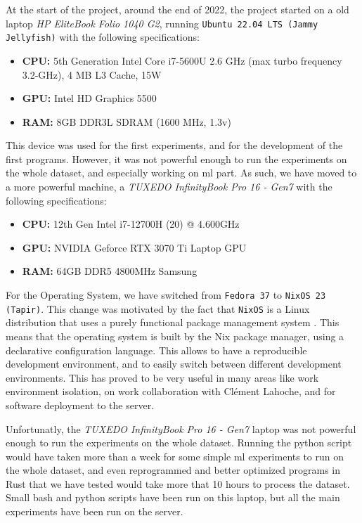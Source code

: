     At the start of the project, around the end of 2022, the project started on a old laptop \textit{HP EliteBook Folio 1040 G2}, running \texttt{Ubuntu 22.04 LTS (Jammy Jellyfish)} with the following specifications:

    \begin{itemize}
        \item \textbf{CPU:} 5th Generation Intel Core i7-5600U 2.6 GHz (max turbo frequency 3.2-GHz), 4 MB L3 Cache, 15W
        \item \textbf{GPU:} Intel HD Graphics 5500
        \item \textbf{RAM:} 8GB DDR3L SDRAM (1600 MHz, 1.3v)
    \end{itemize}

    This device was used for the first experiments, and for the development of the first programs. However, it was not powerful enough to run the experiments on the whole dataset, and especially working on \acrshort{ml} part. As such, we have moved to a more powerful machine, a \textit{TUXEDO InfinityBook Pro 16 - Gen7} with the following specifications:

    \begin{itemize}
        \item \textbf{CPU:} 12th Gen Intel i7-12700H (20) @ 4.600GHz
        \item \textbf{GPU:} NVIDIA Geforce RTX 3070 Ti Laptop GPU
        \item \textbf{RAM:} 64GB DDR5 4800MHz Samsung
    \end{itemize}

    For the Operating System, we have switched from \texttt{Fedora 37} to \texttt{NixOS 23 (Tapir)}. This change was motivated by the fact that \texttt{NixOS} is a Linux distribution that uses a purely functional package management system \cite{NixOS08}. This means that the operating system is built by the Nix package manager, using a declarative configuration language. This allows to have a reproducible development environment, and to easily switch between different development environments. This has proved to be very useful in many areas like work environment isolation, on work collaboration with Clément Lahoche, and for software deployment to the server.
    
    Unfortunatly, the \textit{TUXEDO InfinityBook Pro 16 - Gen7} laptop was not powerful enough to run the experiments on the whole dataset. Running the python script would have taken more than a week for some simple \acrshort{ml} experiments to run on the whole dataset, and even reprogrammed and better optimized programs in Rust that we have tested would take more that 10 hours to process the dataset. Small bash and python scripts have been run on this laptop, but all the main experiments have been run on the server.
    
